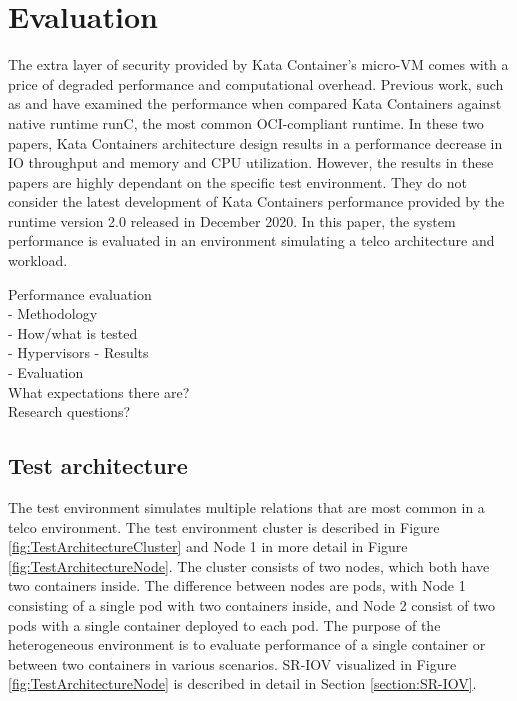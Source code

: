 \chapter{Evaluation}
\label{chapter:evaluation}

The extra layer of security provided by Kata Container's micro-VM comes with a price of degraded performance and computational overhead. Previous work, such as \cite{Kumar2020} and \cite{EverartsdeVelp2020} have examined the performance when compared Kata Containers against native runtime runC, the most common OCI-compliant runtime. In these two papers, Kata Containers architecture design results in a performance decrease in IO throughput and memory and CPU utilization. However, the results in these papers are highly dependant on the specific test environment. They do not consider the latest development of Kata Containers performance provided by the runtime version 2.0 released in December 2020. In this paper, the system performance is evaluated in an environment simulating a telco architecture and workload.


Performance evaluation \\
- Methodology \\
- How/what is tested \\
    - Hypervisors
- Results \\
- Evaluation \\
What expectations there are? \\
Research questions?

\section{Test architecture}
\label{section:test_architecture}

The test environment simulates multiple relations that are most common in a telco environment. The test environment cluster is described in Figure \ref{fig:TestArchitectureCluster} and Node 1 in more detail in Figure \ref{fig:TestArchitectureNode}. The cluster consists of two nodes, which both have two containers inside. The difference between nodes are pods, with Node 1 consisting of a single pod with two containers inside, and Node 2 consist of two pods with a single container deployed to each pod. The purpose of the heterogeneous environment is to evaluate performance of a single container or between two containers in various scenarios. SR-IOV visualized in Figure \ref{fig:TestArchitectureNode} is described in detail in Section \ref{section:SR-IOV}.

